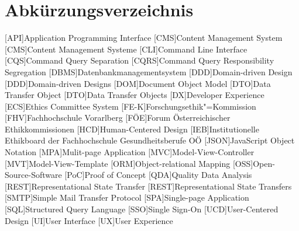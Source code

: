 \documentclass[a4paper,12pt,twoside,numbers=noendperiod]{scrreprt}
\begin{document}
\cleardoublepage
{}
\tableofcontents

\clearpage
{}
{}
\listoffigures

\clearpage
{}
{}
\listoftables

\clearpage
{}
{}
\listoflistings

\clearpage
{}
{}
\chapter*{Abkürzungsverzeichnis}

\begin{acronym}
    [API]{Application Programming Interface}
    [CMS]{Content Management System}
    [CMS]{Content Management Systeme}
    [CLI]{Command Line Interface}
    [CQS]{Command Query Separation}
    [CQRS]{Command Query Responsibility Segregation}
    [DBMS]{Datenbankmanagementsystem}
    [DDD]{Domain-driven Design}
    [DDD]{Domain-driven Designs}
    [DOM]{Document Object Model}
    [DTO]{Data Transfer Object}
    [DTO]{Data Transfer Objects}
    [DX]{Developer Experience}
    [ECS]{Ethics Committee System}
    [FE-K]{Forschungsethik"=Kommission}
    [FHV]{Fachhochschule Vorarlberg}
    [FÖE]{Forum Österreichischer Ethikkommissionen}
    [HCD]{Human-Centered Design}
    [IEB]{Institutionelle Ethikboard der Fachhochschule Gesundheitsberufe OÖ}
    [JSON]{JavaScript Object Notation}
    [MPA]{Mulit-page Application}
    [MVC]{Model-View-Controller}
    [MVT]{Model-View-Template}
    [ORM]{Object-relational Mapping}
    [OSS]{Open-Source-Software}
    [PoC]{Proof of Concept}
    [QDA]{Quality Data Analysis}
    [REST]{Representational State Transfer}
    [REST]{Representational State Transfers}
    [SMTP]{Simple Mail Transfer Protocol}
    [SPA]{Single-page Application}
    [SQL]{Structured Query Language}
    [SSO]{Single Sign-On}
    [UCD]{User-Centered Design}
    [UI]{User Interface}
    [UX]{User Experience}
\end{acronym}
\end{document}
